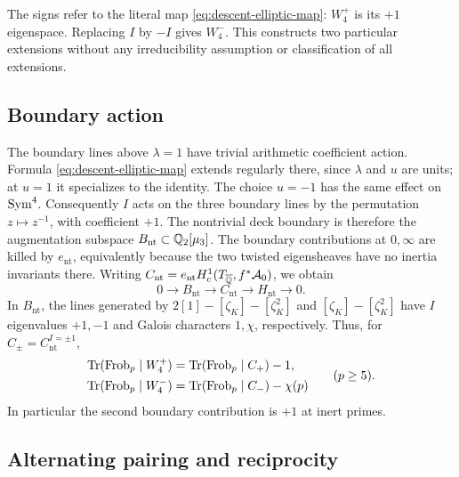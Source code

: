 \begin{remark}
The signs refer to the literal map \eqref{eq:descent-elliptic-map}:
$W_4^+$ is its $+1$ eigenspace. Replacing $I$ by $-I$ gives $W_4^-$.
This constructs two particular extensions without any irreducibility
assumption or classification of all extensions.
\end{remark}

\subsection{Boundary action}

The boundary lines above $\lambda=1$ have trivial arithmetic coefficient
action. Formula \eqref{eq:descent-elliptic-map} extends regularly there,
since $\lambda$ and $u$ are units; at $u=1$ it specializes to the
identity. The choice $u=-1$ has the same effect on $\operatorname{Sym}^4$.
Consequently $I$ acts on the three boundary lines by the permutation
$z\mapsto z^{-1}$, with coefficient $+1$.
The nontrivial deck boundary is therefore the augmentation subspace
$B_{\mathrm{nt}}\subset\mathbb Q_2[\mu_3]$. The boundary contributions at
$0,\infty$ are killed by $e_{\mathrm{nt}}$, equivalently because
the two twisted eigensheaves have no inertia invariants there.
Writing $C_{\mathrm{nt}}=e_{\mathrm{nt}}H_c^1(T_{\overline{\mathbb Q}},f^*\mathcal A_0)$,
we obtain
\begin{equation}\label{eq:descent-boundary-exact}
 0\longrightarrow B_{\mathrm{nt}}\longrightarrow C_{\mathrm{nt}}
   \longrightarrow H_{\mathrm{nt}}\longrightarrow0.
\end{equation}
In $B_{\mathrm{nt}}$, the lines generated by
$2[1]-[\zeta_K]-[\zeta_K^2]$ and $[\zeta_K]-[\zeta_K^2]$
have $I$ eigenvalues $+1,-1$ and Galois characters $1,\chi$, respectively.
Thus, for $C_\pm=C_{\mathrm{nt}}^{I=\pm1}$,
\begin{equation}\label{eq:descent-boundary-traces}
 \begin{aligned}
 \operatorname{Tr}(\operatorname{Frob}_p\mid W_4^+)&=\operatorname{Tr}(\operatorname{Frob}_p\mid C_+)-1,\\
 \operatorname{Tr}(\operatorname{Frob}_p\mid W_4^-)&=\operatorname{Tr}(\operatorname{Frob}_p\mid C_-)-\chi(p)
 \end{aligned}
 \qquad(p\ge5).
\end{equation}
In particular the second boundary contribution is $+1$ at inert primes.

\subsection{Alternating pairing and reciprocity}

